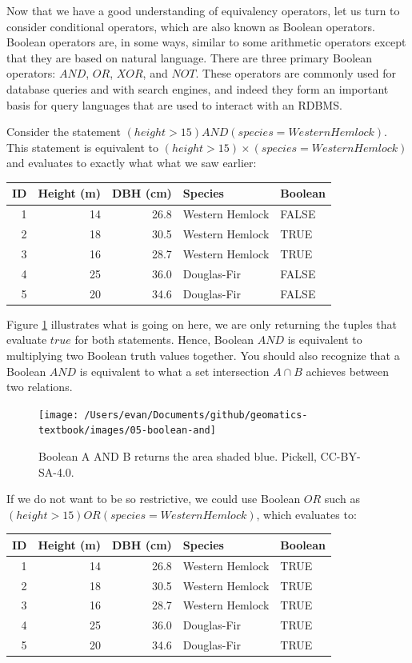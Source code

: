 \documentclass[
]{book}
\begin{document}
Now that we have a good understanding of equivalency operators, let us turn to consider conditional operators, which are also known as Boolean operators. Boolean operators are, in some ways, similar to some arithmetic operators except that they are based on natural language. There are three primary Boolean operators: \(AND\), \(OR\), \(XOR\), and \(NOT\). These operators are commonly used for database queries and with search engines, and indeed they form an important basis for query languages that are used to interact with an RDBMS.

Consider the statement \((height>15)AND(species=WesternHemlock)\). This statement is equivalent to \((height>15)×(species=WesternHemlock)\) and evaluates to exactly what what we saw earlier:

\begin{tabular}{rrrll}
\toprule
ID & Height (m) & DBH (cm) & Species & Boolean\\
\midrule
1 & 14 & 26.8 & Western Hemlock & FALSE\\
2 & 18 & 30.5 & Western Hemlock & TRUE\\
3 & 16 & 28.7 & Western Hemlock & TRUE\\
4 & 25 & 36.0 & Douglas-Fir & FALSE\\
5 & 20 & 34.6 & Douglas-Fir & FALSE\\
\bottomrule
\end{tabular}

Figure \ref{fig:5-boolean-and} illustrates what is going on here, we are only returning the tuples that evaluate \(true\) for both statements. Hence, Boolean \(AND\) is equivalent to multiplying two Boolean truth values together. You should also recognize that a Boolean \(AND\) is equivalent to what a set intersection \(A∩B\) achieves between two relations.

\begin{figure}
\texttt{[image: /Users/evan/Documents/github/geomatics-textbook/images/05-boolean-and]} \caption{Boolean A AND B returns the area shaded blue. Pickell, CC-BY-SA-4.0.}\label{fig:5-boolean-and}
\end{figure}

If we do not want to be so restrictive, we could use Boolean \(OR\) such as \((height>15)OR(species=WesternHemlock)\), which evaluates to:

\begin{tabular}{rrrll}
\toprule
ID & Height (m) & DBH (cm) & Species & Boolean\\
\midrule
1 & 14 & 26.8 & Western Hemlock & TRUE\\
2 & 18 & 30.5 & Western Hemlock & TRUE\\
3 & 16 & 28.7 & Western Hemlock & TRUE\\
4 & 25 & 36.0 & Douglas-Fir & TRUE\\
5 & 20 & 34.6 & Douglas-Fir & TRUE\\
\bottomrule
\end{tabular}
\end{document}
